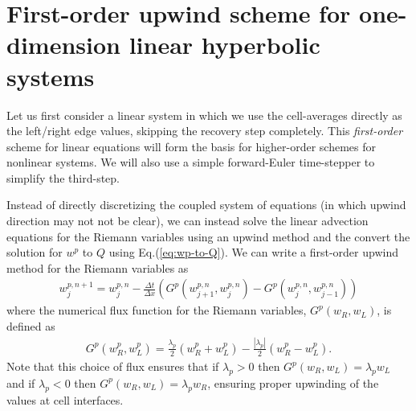 \documentclass[12pt]{article}
\theoremstyle{definition}
\theoremstyle{definition}
\theoremstyle{definition}
\newcommand{\eqr}[1]{Eq.\thinspace(#1)}
\begin{document}
\section{First-order upwind scheme for one-dimension linear hyperbolic
  systems}

Let us first consider a linear system in which we use the
cell-averages directly as the left/right edge values, skipping the
recovery step completely. This \emph{first-order} scheme for linear
equations will form the basis for higher-order schemes for nonlinear
systems. We will also use a simple forward-Euler time-stepper to
simplify the third-step.

Instead of directly discretizing the coupled system of equations (in
which upwind direction may not not be clear), we can instead solve the
linear advection equations for the Riemann variables using an upwind
method and the convert the solution for $w^p$ to $Q$ using
\eqr{\ref{eq:wp-to-Q}}. We can write a first-order upwind method for
the Riemann variables as
\begin{align}
w^{p,n+1}_j = w^{p,n}_j - \frac{\Delta t}{\Delta x}
\left(
G^p(w^{p,n}_{j+1},w^{p,n}_{j}) - G^p(w^{p,n}_{j},w^{p,n}_{j-1})
\right)
\end{align}
where the numerical flux function for the Riemann variables,
$G^p(w_R,w_L)$, is defined as
\begin{align}
G^p(w_R^p,w_L^p) = \frac{\lambda_p}{2}(w_R^p + w_L^p) - \frac{|\lambda_p|}{2}(w_R^p - w_L^p).
\end{align}
Note that this choice of flux ensures that if $\lambda_p>0$ then
$G^p(w_R,w_L) = \lambda_p w_L$ and if $\lambda_p < 0$ then
$G^p(w_R,w_L) = \lambda_p w_R$, ensuring proper upwinding of the
values at cell interfaces.
\end{document}
